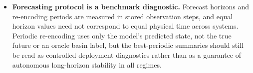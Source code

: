 \begin{itemize}
  \item \textbf{Forecasting protocol is a benchmark diagnostic.}
  Forecast horizons and re-encoding periods are measured in stored observation
  steps, and equal horizon values need not correspond to equal physical time
  across systems.  Periodic re-encoding uses only the model's predicted state,
  not the true future or an oracle basin label, but the best-periodic summaries
  should still be read as controlled deployment diagnostics rather than as a
  guarantee of autonomous long-horizon stability in all regimes.
\end{itemize}
